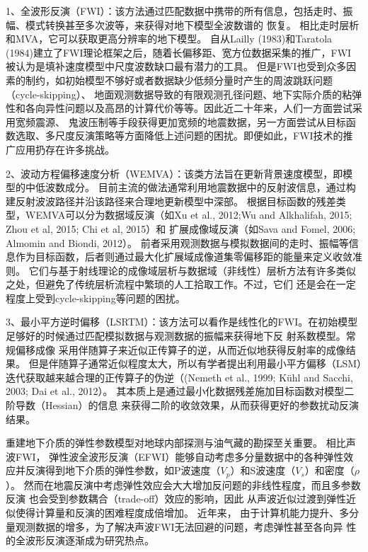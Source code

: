 
1、全波形反演（FWI）：该方法通过匹配数据中携带的所有信息，包括走时、振幅、模式转换甚至多次波等，来获得对地下模型全波数谱的
恢复。
相比走时层析和MVA，它可以获取更高分辨率的地下模型。
自从Lailly (1983)\cite{lailly1983seismic}和Taratola
(1984)\cite{tarantola1984}建立了FWI理论框架之后，随着长偏移距、宽方位数据采集的推广，FWI
被认为是填补速度模型中尺度波数缺口最有潜力的工具。
但是FWI也受到众多因素的制约，如初始模型不够好或者数据缺少低频分量时产生的周波跳跃问题（cycle-skipping）、
地面观测数据导致的有限观测孔径问题、地下实际介质的粘弹性和各向异性问题以及高昂的计算代价等等。因此近二十年来，人们一方面尝试采用宽频震源、
鬼波压制等手段获得更加宽频的地震数据，另一方面尝试从目标函数选取、多尺度反演策略等方面降低上述问题的困扰。即便如此，FWI技术的推广应用扔存在许多挑战。

2、波动方程偏移速度分析（WEMVA）：该类方法旨在更新背景速度模型，即模型的中低波数成分。
目前主流的做法通常利用地震数据中的反射波信息，通过构建反射波波路径并沿该路径来合理地更新模型中深部。
根据目标函数的残差类型，WEMVA可以分为数据域反演（如Xu et al., 2012\cite{xu:2012};Wu and Alkhalifah,
2015\cite[]{Wu2015b}; Zhou et al,
2015\cite[]{zhou:2015}; Chi et al, 2015\cite{chi2015}）和
扩展成像域反演（如Sava and Fomel, 2006\cite{Sava2006}; Almomin and Biondi, 2012\cite{Almomin2012}）。
前者采用观测数据与模拟数据间的走时、振幅等信息作为目标函数，后者则通过最大化扩展域成像道集零偏移距的能量来定义收敛准则。
它们与基于射线理论的成像域层析与数据域（非线性）层析方法有许多类似之处，但避免了传统层析流程中繁琐的人工拾取工作。不过，它们
还是会在一定程度上受到cycle-skipping等问题的困扰。

3、最小平方逆时偏移（LSRTM）：该方法可以看作是线性化的FWI。在初始模型足够好的时候通过匹配模拟数据与观测数据的振幅来获得地下反
射系数模型。常规偏移成像
采用伴随算子来近似正传算子的逆，从而近似地获得反射率的成像结果。
但是伴随算子通常近似程度太大，所以有学者提出利用最小平方偏移（LSM）迭代获取越来越合理的正传算子的伪逆（(Nemeth
et al., 1999\cite{Nemeth1999}; Kühl and Sacchi, 2003\cite{KuehlEtAl2003};
Dai et al.,
2012\cite{DaiEtAl2012}）。
其本质上是通过最小化数据残差施加目标函数对模型二阶导数（Hessian）的信息
来获得二阶的收敛效果，从而获得更好的参数扰动反演结果。

重建地下介质的弹性参数模型对地球内部探测与油气藏的勘探至关重要。
相比声波FWI，
弹性波全波形反演（EFWI）能够自动考虑多分量数据中的各种弹性效应并反演得到地下介质的弹性参数，如P波速度（$V_p$）和S波速度（$V_s$）和密度（$\rho$）。
然而在地震反演中考虑弹性效应会大大增加反问题的非线性程度，而且多参数反演
也会受到参数耦合（trade-off）效应的影响，因此
从声波近似过渡到弹性近似使得计算量和反演的困难程度成倍增加。
近年来，
由于计算机能力提升、多分量观测数据的增多，为了解决声波FWI无法回避的问题，考虑弹性甚至各向异
性的全波形反演逐渐成为研究热点。

